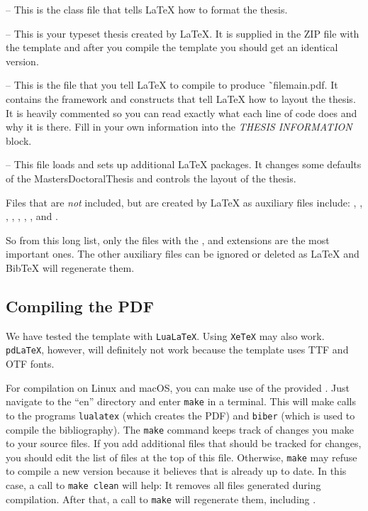  -- This is the class file that tells LaTeX how to format the thesis.

 -- This is your typeset thesis created by LaTeX. It is supplied in the ZIP file with the template and after you compile the template you should get an identical version.

 -- This is the file that you tell LaTeX to compile to produce ˜file{main.pdf}. It contains the framework and constructs that tell LaTeX how to layout the thesis. It is heavily commented so you can read exactly what each line of code does and why it is there. Fill in your own information into the \emph{THESIS INFORMATION} block.

 -- This file loads and sets up additional LaTeX packages. It changes some defaults of the MastersDoctoralThesis and controls the layout of the thesis.

Files that are \emph{not} included, but are created by LaTeX as auxiliary files include: , , , , 
, , , and .

So from this long list, only the files with the ,  and  extensions are the most important ones. The other auxiliary files can be ignored or deleted as LaTeX and BibTeX will regenerate them.


\subsection{Compiling the PDF}

We have tested the template with \texttt{LuaLaTeX}. Using \texttt{XeTeX} may also work. \texttt{pdLaTeX}, however, will definitely not work because the template uses TTF and OTF fonts.

For compilation on Linux and macOS, you can make use of the provided . Just navigate to the ``en'' directory and enter \texttt{make} in a terminal. This will make calls to the programs \texttt{lualatex} (which creates the PDF) and \texttt{biber} (which is used to compile the bibliography). The \texttt{make} command keeps track of changes you make to your source files. If you add additional files that should be tracked for changes, you should edit the list of files at the top of this file. Otherwise, \texttt{make} may refuse to compile a new version because it believes that  is already up to date. In this case, a call to \texttt{make clean} will help: It removes all files generated during compilation. After that, a call to \texttt{make} will regenerate them, including .


